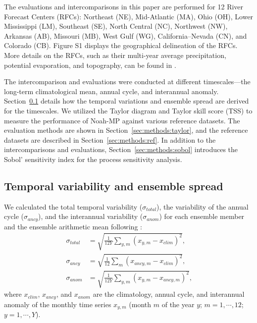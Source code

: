 \documentclass[essd, manuscript]{copernicus}
\begin{document}
The evaluations and intercomparisons in this paper are performed for 12 River Forecast Centers (RFCs): Northeast (NE), Mid-Atlantic (MA), Ohio (OH), Lower Mississippi (LM), Southeast (SE), North Central (NC), Northwest (NW), Arkansas (AB), Missouri (MB), West Gulf (WG), California--Nevada (CN), and Colorado (CB). Figure S1 displays the geographical delineation of the RFCs. More details on the RFCs, such as their multi-year average precipitation, potential evaporation, and topography, can be found in \citet[Figure 1]{fei2021WRR}.

The intercomparison and evaluations were conducted at different timescales---the long-term climatological mean, annual cycle, and interannual anomaly. Section~\ref{sec:methods:variation} details how the temporal variations and ensemble spread are derived for the timescales. We utilized the Taylor diagram and Taylor skill score (TSS) to measure the performance of Noah-MP against various reference datasets. The evaluation methods are shown in Section~\ref{sec:methods:taylor}, and the reference datasets are described in Section~\ref{sec:methods:ref}. In addition to the intercomparisons and evaluations, Section~\ref{sec:methods:sobol} introduces the Sobol' sensitivity index for the process sensitivity analysis.

\subsection{Temporal variability and ensemble spread}\label{sec:methods:variation}

We calculated the total temporal variability (\(\sigma_{total}\)), the variability of the annual cycle (\(\sigma_{ancy}\)), and the interannual variability (\(\sigma_{anom}\)) for each ensemble member and the ensemble arithmetic mean following \citet{dirmeyer2006BAMS}:
\begin{align}
  \sigma_{total} & = \sqrt{\frac{1}{12 Y}\sum_{y,m} (x_{y,m} - x_{clim})^2}
  \text{,}
  \label{eq:var:total} \\
  \sigma_{ancy}  & = \sqrt{\frac{1}{12}\sum_{m} (x_{ancy,m} - x_{clim})^2}
  \text{,} \\
  \sigma_{anom}  & = \sqrt{\frac{1}{12 Y} \sum_{y,m} (x_{y,m} - x_{ancy,m})^2}
  \text{,}
\end{align}
where \(x_{clim}\), \(x_{ancy}\), and \(x_{anom}\) are the climatology, annual cycle, and interannual anomaly of the monthly time series \(x_{y,m}\) (month \(m\) of the year \(y\); \(m=1, \cdots, 12\); \(y=1, \cdots, Y\)).
\end{document}
